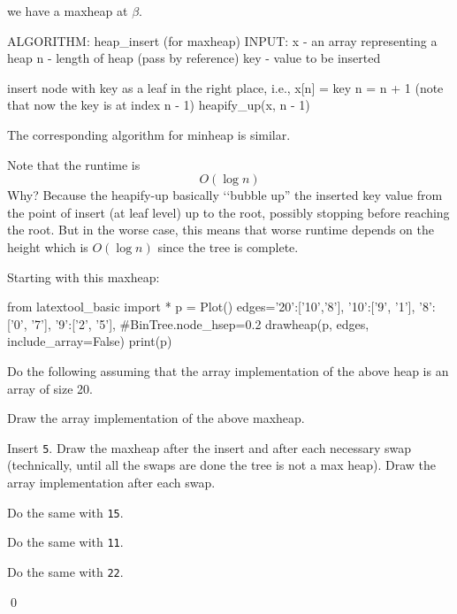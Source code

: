 we have a maxheap at $\beta$.

\begin{console}[commandchars=\\\{\}]
ALGORITHM: heap_insert (for maxheap)
INPUT: x - an array representing a heap
       n - length of heap (pass by reference)
       key - value to be inserted

insert node with key as a leaf in the right place, i.e.,
x[n] = key
n = n + 1 (note that now the key is at index n - 1)
heapify_up(x, n - 1)
\end{console}

The corresponding algorithm for minheap is similar.

Note that the runtime is
\[
O(\log n)
\]
Why?
Because the heapify-up basically \lq\lq bubble up''
the inserted key value from the point of insert (at leaf level)
up to the root,
possibly stopping before reaching the root.
But in the worse case, this means that
worse runtime depends on the height which is $O(\log n)$
since the tree is complete.





\newpage
\begin{ex}
  Starting with this maxheap:

\begin{python}
from latextool_basic import *
p = Plot()
edges={'20':['10','8'],
       '10':['9', '1'],
       '8':['0', '7'],
       '9':['2', '5'],
     }
#BinTree.node_hsep=0.2
drawheap(p, edges, include_array=False)
print(p)
\end{python}


Do the following assuming that the array implementation
of the above heap is an array of size 20.
\begin{tightlist}
\item Draw the array implementation of the above maxheap.
\item Insert \texttt{5}. Draw the maxheap after the insert
and after each necessary swap (technically, until all the swaps are done
the tree is not a max heap). Draw the array implementation
after each swap.
\item Do the same with \texttt{15}.
\item Do the same with \texttt{11}.
\item Do the same with \texttt{22}.
\end{tightlist}
\qed
\end{ex}


